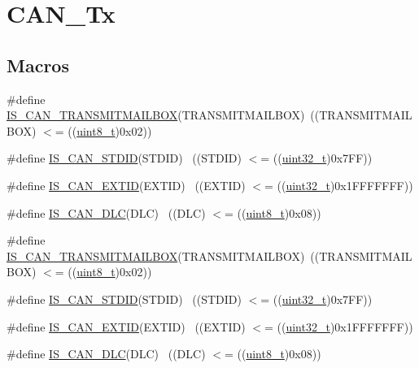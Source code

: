 \hypertarget{group___c_a_n___tx}{}\section{C\+A\+N\+\_\+\+Tx}
\label{group___c_a_n___tx}
\subsection*{Macros}
\begin{DoxyCompactItemize}
\item 
\#define \hyperlink{group___c_a_n___tx_ga218b3e1380c4d49163c91a1af904e44c}{I\+S\+\_\+\+C\+A\+N\+\_\+\+T\+R\+A\+N\+S\+M\+I\+T\+M\+A\+I\+L\+B\+OX}(T\+R\+A\+N\+S\+M\+I\+T\+M\+A\+I\+L\+B\+OX)~((T\+R\+A\+N\+S\+M\+I\+T\+M\+A\+I\+L\+B\+OX) $<$= ((\hyperlink{_p_e___types_8h_aba7bc1797add20fe3efdf37ced1182c5}{uint8\+\_\+t})0x02))
\item 
\#define \hyperlink{group___c_a_n___tx_gad735591c3a6843cb433883a786c847b9}{I\+S\+\_\+\+C\+A\+N\+\_\+\+S\+T\+D\+ID}(S\+T\+D\+ID)  ~((S\+T\+D\+ID) $<$= ((\hyperlink{_p_e___types_8h_a33594304e786b158f3fb30289278f5af}{uint32\+\_\+t})0x7\+F\+F))
\item 
\#define \hyperlink{group___c_a_n___tx_ga028f9bf48927727a83215606d897e678}{I\+S\+\_\+\+C\+A\+N\+\_\+\+E\+X\+T\+ID}(E\+X\+T\+ID)  ~((E\+X\+T\+ID) $<$= ((\hyperlink{_p_e___types_8h_a33594304e786b158f3fb30289278f5af}{uint32\+\_\+t})0x1\+F\+F\+F\+F\+F\+F\+F))
\item 
\#define \hyperlink{group___c_a_n___tx_gacb5ffd01496394e97ac30f0cb084a4fe}{I\+S\+\_\+\+C\+A\+N\+\_\+\+D\+LC}(D\+LC)          ~((D\+LC) $<$= ((\hyperlink{_p_e___types_8h_aba7bc1797add20fe3efdf37ced1182c5}{uint8\+\_\+t})0x08))
\item 
\#define \hyperlink{group___c_a_n___tx_ga218b3e1380c4d49163c91a1af904e44c}{I\+S\+\_\+\+C\+A\+N\+\_\+\+T\+R\+A\+N\+S\+M\+I\+T\+M\+A\+I\+L\+B\+OX}(T\+R\+A\+N\+S\+M\+I\+T\+M\+A\+I\+L\+B\+OX)~((T\+R\+A\+N\+S\+M\+I\+T\+M\+A\+I\+L\+B\+OX) $<$= ((\hyperlink{_p_e___types_8h_aba7bc1797add20fe3efdf37ced1182c5}{uint8\+\_\+t})0x02))
\item 
\#define \hyperlink{group___c_a_n___tx_gad735591c3a6843cb433883a786c847b9}{I\+S\+\_\+\+C\+A\+N\+\_\+\+S\+T\+D\+ID}(S\+T\+D\+ID)  ~((S\+T\+D\+ID) $<$= ((\hyperlink{_p_e___types_8h_a33594304e786b158f3fb30289278f5af}{uint32\+\_\+t})0x7\+F\+F))
\item 
\#define \hyperlink{group___c_a_n___tx_ga028f9bf48927727a83215606d897e678}{I\+S\+\_\+\+C\+A\+N\+\_\+\+E\+X\+T\+ID}(E\+X\+T\+ID)  ~((E\+X\+T\+ID) $<$= ((\hyperlink{_p_e___types_8h_a33594304e786b158f3fb30289278f5af}{uint32\+\_\+t})0x1\+F\+F\+F\+F\+F\+F\+F))
\item 
\#define \hyperlink{group___c_a_n___tx_gacb5ffd01496394e97ac30f0cb084a4fe}{I\+S\+\_\+\+C\+A\+N\+\_\+\+D\+LC}(D\+LC)          ~((D\+LC) $<$= ((\hyperlink{_p_e___types_8h_aba7bc1797add20fe3efdf37ced1182c5}{uint8\+\_\+t})0x08))
\end{DoxyCompactItemize}


